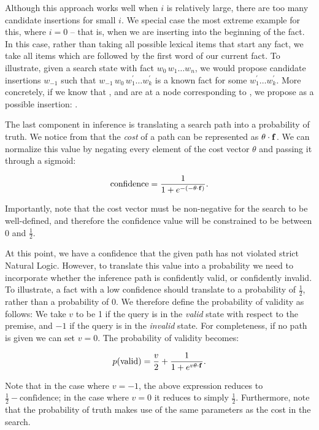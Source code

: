 Although this approach works well when $i$ is relatively large, there
  are too many candidate insertions for small $i$.
We special case the most extreme example for this, where $i=0$ -- that is, 
  when we are inserting into the beginning of the fact.
In this case, rather than taking all possible lexical items that start
  any fact, we take all items which are followed by the first word of
  our current fact.
To illustrate, given a search state with fact $w_0\,w_1 \dots w_n$,
  we would propose candidate insertions $w_{-1}$ such that
  $w_{-1}\,w_0\,w^\prime_1 \dots w^\prime_k$ is a known fact
  for some $w^\prime_1 \dots w^\prime_k$.
More concretely, if we know that , and are
  at a node corresponding to , we propose 
  as a possible insertion: .

%
%
The last component in inference is translating a search path into a
  probability of truth.
We notice from  that the \textit{cost}
  of a path can be represented as $\theta \cdot \mathbf{f}$.
We can normalize this value by negating every element of the cost
  vector $\theta$ and passing it through a sigmoid:

\begin{equation*}
\textrm{confidence} = \frac{1}{1 + e^{- (-\theta \cdot \mathbf{f})}}.
\end{equation*}

Importantly, note that the cost vector must be non-negative for the
  search to be well-defined, and therefore the confidence value will
  be constrained to be between 0 and $\frac{1}{2}$.

At this point, we have a confidence that the given path has not violated
  strict Natural Logic.
However, to translate this value into a probability
  we need to incorporate whether the inference path is
  confidently valid, or confidently invalid.
To illustrate, a fact with a low confidence should translate to a
  probability of $\frac{1}{2}$, rather than a probability of 0.
We therefore define the probability of validity as follows:
We take $v$ to be 1 if the query is in the
  \textit{valid} state with respect to the premise,
  and $-1$ if the query is in the \textit{invalid} state.
For completeness, if no path is given we can set $v=0$.
The probability of validity becomes:

\begin{equation}
  p(\textrm{valid}) = \frac{v}{2} + \frac{1}{1 + e^{v \theta \cdot \mathbf{f}}}.
  \label{eqn:prob}
\end{equation}

Note that in the case where $v=-1$, the above expression reduces to
  $\frac{1}{2} - \textrm{confidence}$; in the case where $v=0$ it
  reduces to simply $\frac{1}{2}$.
Furthermore, note that the probability of truth makes use of the same
  parameters as the cost in the search.
